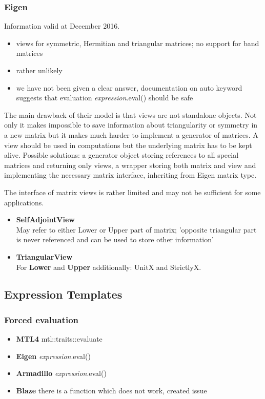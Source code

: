 \documentclass{article}
\begin{document}
\subsubsection{Eigen}
Information valid at December 2016. \\
\begin{itemize}
\item views for symmetric, Hermitian and triangular matrices\cite{eigenViewSymm}\cite{eigenViewTriang}; no support for band matrices\cite{eigenBand}
\item rather unlikely\cite{eigenEval}
\item we have not been given a clear answer\cite{eigenEval}, documentation on auto keyword suggests that evaluation \textit{expression}.eval() should be safe
\end{itemize}

The main drawback of their model is that views are not standalone objects. Not only it makes impossible to save information about triangularity or symmetry in a new matrix but it makes much harder to implement a generator of matrices. A view should be used in computations but the underlying matrix has to be kept alive. Possible solutions: a generator object storing references to all special matrices and returning only views, a wrapper storing both matrix and view and implementing the necessary matrix interface, inheriting from Eigen matrix type.

The interface of matrix views is rather limited and may not be sufficient for some applications.
\begin{itemize}
\item \textbf{SelfAdjointView} \\
May refer to either Lower or Upper part of matrix; 'opposite triangular part is never referenced and can be used to store other information'
\item \textbf{TriangularView} \\
For \textbf{Lower} and \textbf{Upper} additionally: UnitX and StrictlyX. 
\end{itemize}

\subsection{Expression Templates}

\subsubsection{Forced evaluation}
\begin{itemize}
\item \textbf{MTL4} mtl::traits::evaluate \\
\item \textbf{Eigen} \textit{expression}.eval() \\
\item \textbf{Armadillo} \textit{expression}.eval() \\
\item \textbf{Blaze} there is a function which does not work, created issue \\
\end{itemize}
\end{document}
